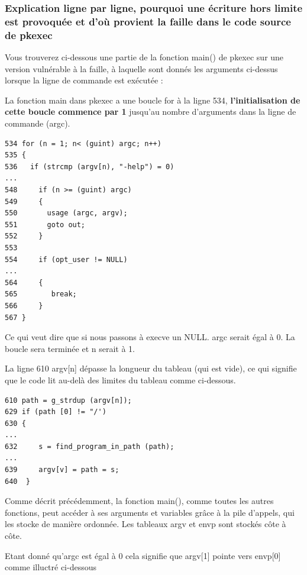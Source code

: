 \documentclass[12pt,a4paper]{article}
\begin{document}
\begin{flushleft}
            \subsubsection{Explication ligne par ligne, pourquoi une écriture hors limite est provoquée et d'où provient la faille dans le code source de pkexec}
                \item  Vous trouverez ci-dessous une partie de la fonction main() de pkexec sur une version vulnérable à la faille, à laquelle sont donnés les arguments ci-dessus lorsque la ligne de commande est exécutée :
                \item La fonction main{} dans pkexec a une boucle for à la ligne 534, \textbf{l'initialisation de cette boucle commence par 1} jusqu'au nombre d'arguments dans la ligne de commande (argc).
                \begin{lstlisting}
534 for (n = 1; n< (guint) argc; n++)
535 {
536   if (strcmp (argv[n), "-help") = 0)
...
548     if (n >= (guint) argc)
549     {
550       usage (argc, argv);  
551       goto out;
552     }
553
554     if (opt_user != NULL)
...
564     {
565        break;
566     }
567 }
                \end{lstlisting}
                \item Ce qui veut dire que si nous passons à execve un NULL. argc serait égal à 0. La boucle sera terminée et n serait à 1.
                \item La ligne 610 argv[n] dépasse la longueur du tableau (qui est vide), ce qui signifie que le code lit au-delà des limites du tableau comme ci-dessous.
                \begin{lstlisting}
610 path = g_strdup (argv[n]);
629 if (path [0] != "/')
630 {
...
632     s = find_program_in_path (path);
...
639     argv[v] = path = s;
640  }
                \end{lstlisting}
                \item Comme décrit précédemment, la fonction main(), comme toutes les autres fonctions, peut accéder à ses arguments et variables grâce à la pile d’appels, qui les stocke de manière ordonnée. Les tableaux argv et envp sont stockés côte à côte.
                \item  Etant donné qu'argc est égal à 0 cela signifie que argv[1] pointe vers envp[0] comme illuctré ci-dessous
                \begin{center}

\end{center}
\end{flushleft}
\end{document}
